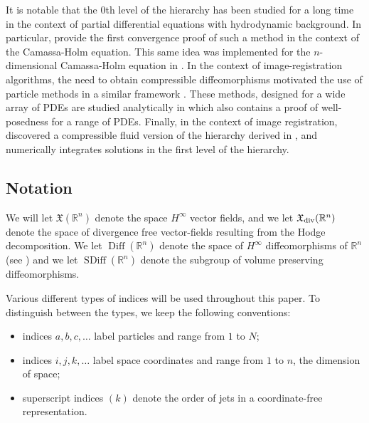 \documentclass[12pt]{amsart}
\newcommand{\R}{\ensuremath{\mathbb{R}}}
\DeclareMathOperator{\SDiff}{SDiff}
\DeclareMathOperator{\Diff}{Diff}
\begin{document}
 It is notable that the $0$th level of the hierarchy has been studied
 for a long time in the context of partial differential equations with hydrodynamic background.
 In particular, \cite{HoldenRaynaud2006} provide the first convergence proof of such a method in the context of the Camassa-Holm equation.
 This same idea was implemented for the $n$-dimensional Camassa-Holm
 equation in \cite{ChertockDuToitMarsden2012}.
 In the context of image-registration algorithms, the need to obtain 
 compressible diffeomorphisms motivated the use of particle methods
 in a similar framework \cite{JoshiMiller2000}.
 These methods, designed for a wide array of PDEs are studied analytically
 in \cite{TrouveYounes2005} which also contains a proof of well-posedness
 for a range of PDEs.
 Finally, in the context of image registration, \cite{Sommer2013} 
 discovered a compressible fluid version of the hierarchy derived in \cite{JacobsRatiuDesbrun2013},
 and numerically integrates solutions in the first level of the hierarchy.

\subsection{Notation}
We will let $\mathfrak{X}(\R^n)$ denote the space $H^\infty$ vector fields,
and we let $\mathfrak{X}_{\rm div}(\R^n)$
denote the space of divergence free vector-fields resulting from the Hodge decomposition.
We let $\Diff(\R^n)$ denote the space of $H^\infty$ diffeomorphisms of $\R^n$  (see \cite{MichorMumford2013})
and we let $\SDiff(\R^n)$ denote the subgroup of volume preserving diffeomorphisms.

Various different types of indices will be used throughout this paper.
To distinguish between the types, we keep the following
conventions:
\begin{itemize}
\item indices $a,b,c,\ldots$ label particles and range from $1$ to $N$;
\item indices $i,j,k,\ldots$ label space coordinates and range from
  $1$ to $n$, the dimension of space;
\item superscript indices $(k)$ denote the order of jets in a
  coordinate-free representation.
\end{itemize}
\end{document}
